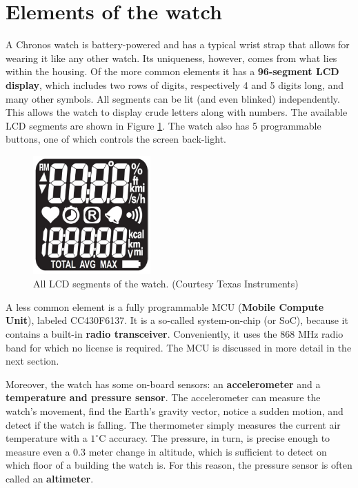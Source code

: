 \section{Elements of the watch}
A Chronos watch is battery-powered and has a typical wrist strap that
allows for wearing it like any other watch. Its uniqueness, however,
comes from what lies within the housing. Of the more common elements
it has a {\bf 96-segment LCD display}, which includes two rows of
digits, respectively 4 and 5 digits long, and many other symbols. All
segments can be lit (and even blinked) independently.  This allows the
watch to display crude letters along with numbers. The available LCD
segments are shown in Figure \ref{fig:chronos_segs}.  The watch also
has 5 programmable buttons, one of which controls the screen
back-light.

\begin{figure}[h]
  \centering
  \includegraphics[width=0.4\textwidth]{img/chronos_segs.png}
  \caption{All LCD segments of the watch. (Courtesy Texas
  Instruments)}
  \label{fig:chronos_segs}
\end{figure}

A less common element is a fully programmable MCU ({\bf Mobile Compute
Unit}), labeled CC430F6137. It is a so-called system-on-chip (or
SoC), because it contains a built-in {\bf radio transceiver}.
Conveniently, it uses the 868 MHz radio band for which no license is
required. The MCU is discussed in more detail in the next section.

Moreover, the watch has some on-board sensors: an {\bf accelerometer}
and a {\bf temperature and pressure sensor}. The accelerometer can
measure the watch's movement, find the Earth's gravity vector,
notice a sudden motion, and detect if the watch is falling. The
thermometer simply measures the current air temperature with a
$1^{\circ}$C accuracy. The pressure, in turn, is precise enough to
measure even a 0.3 meter change in altitude, which is sufficient to
detect on which floor of a building the watch is. For this reason, the
pressure sensor is often called an {\bf altimeter}.

